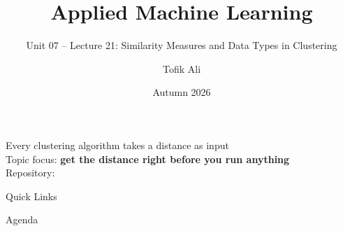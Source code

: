 \documentclass[aspectratio=169]{beamer}
\title[Applied Machine Learning]{Applied Machine Learning}
\subtitle{Unit 07 -- Lecture 21: Similarity Measures and Data Types in
Clustering}
\author{Tofik Ali}
\institute{School of Computer Science, UPES Dehradun}
\date{Autumn 2026}
\begin{document}
\UPESCoverFrame
\setcounter{framenumber}{0}

\begin{frame}[shrink=4]
  \titlepage
  \begin{center}
    \footnotesize Every clustering algorithm takes a distance as input\\[0.25em]
    \footnotesize Topic focus: \textbf{get the distance right before you run
    anything}\\[0.25em]
    \footnotesize Repository: \texttt{\AMLRepoURL}
  \end{center}
  \slidesources{\AMLUnitVIISources}
\end{frame}

\begin{frame}{Quick Links}
  \centering
  \hyperlink{sec:axioms}{}\hspace{0.4em}
  \hyperlink{sec:mink}{}\hspace{0.4em}
  \hyperlink{sec:cos}{}\hspace{0.4em}
  \hyperlink{sec:bin}{}\\[0.6em]
  \hyperlink{sec:nomord}{}\hspace{0.4em}
  \hyperlink{sec:mixed}{}\hspace{0.4em}
  \hyperlink{sec:std}{}\hspace{0.4em}
  \hyperlink{sec:cent}{}\hspace{0.4em}
  \hyperlink{sec:summary}{}
\end{frame}

\begin{frame}{Agenda}
  \tableofcontents
\end{frame}
\end{document}
